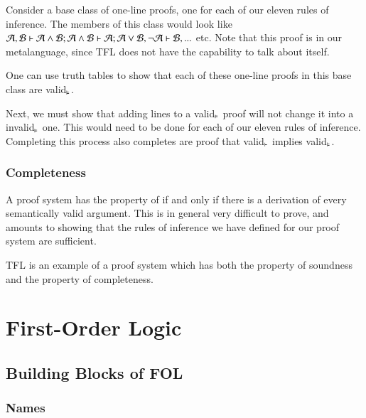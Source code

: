 \documentclass[12pt, a4paper, twoside, openright, titlepage]{book}
\begin{document}
Consider a base class of one-line proofs, one for each of our eleven rules of inference. The members of this class would look like $\mathcal{A},\mathcal{B}\vdash\mathcal{A}\wedge\mathcal{B}; \mathcal{A}\wedge\mathcal{B}\vdash\mathcal{A};\mathcal{A}\vee\mathcal{B},\neg\mathcal{A}\vdash\mathcal{B},...$ etc. Note that this proof is in our metalanguage, since TFL does not have the capability to talk about itself. 

One can use truth tables to show that each of these one-line proofs in this base class are valid$_{\vDash}$.

Next, we must show that adding lines to a valid$_{\vDash}$ proof will not change it into a invalid$_{\vDash}$ one. This would need to be done for each of our eleven rules of inference. Completing this process also completes are proof that valid$_{\vdash}$ implies valid$_{\vDash}$. 


\section{\textsection Completeness}

\begin{defn}{}{}
    A proof system has the property of  if and only if there is a derivation of every semantically valid argument. This is in general very difficult to prove, and amounts to showing that the rules of inference we have defined for our proof system are sufficient.
\end{defn}

\begin{rmk}{}{}
    TFL is an example of a proof system which has both the property of soundness and the property of completeness.
\end{rmk}






\part{First-Order Logic}

\chapter{\textsection\textsection Building Blocks of FOL}

\section{\textsection Names}
\end{document}
